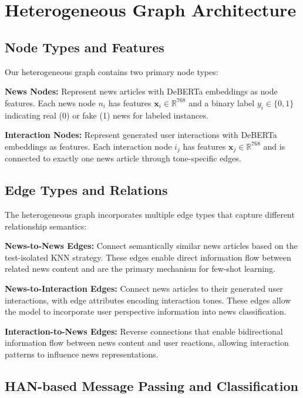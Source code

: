 \section{Heterogeneous Graph Architecture}

\subsection{Node Types and Features}

Our heterogeneous graph contains two primary node types:

\textbf{News Nodes:} Represent news articles with DeBERTa embeddings as node features. Each news node $n_i$ has features $\mathbf{x}_i \in \mathbb{R}^{768}$ and a binary label $y_i \in \{0, 1\}$ indicating real (0) or fake (1) news for labeled instances.

\textbf{Interaction Nodes:} Represent generated user interactions with DeBERTa embeddings as features. Each interaction node $i_j$ has features $\mathbf{x}_j \in \mathbb{R}^{768}$ and is connected to exactly one news article through tone-specific edges.

\subsection{Edge Types and Relations}

The heterogeneous graph incorporates multiple edge types that capture different relationship semantics:

\textbf{News-to-News Edges:} Connect semantically similar news articles based on the test-isolated KNN strategy. These edges enable direct information flow between related news content and are the primary mechanism for few-shot learning.

\textbf{News-to-Interaction Edges:} Connect news articles to their generated user interactions, with edge attributes encoding interaction tones. These edges allow the model to incorporate user perspective information into news classification.

\textbf{Interaction-to-News Edges:} Reverse connections that enable bidirectional information flow between news content and user reactions, allowing interaction patterns to influence news representations.

\subsection{HAN-based Message Passing and Classification}

